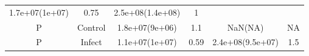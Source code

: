 \documentclass[]{article}
\begin{document}
\begin{longtable}[]{@{}cccccc@{}}
\begin{minipage}[t]{0.15\columnwidth}
1.7e+07(1e+07)
\strut\end{minipage} &
\begin{minipage}[t]{0.16\columnwidth}\centering\strut
0.75
\strut\end{minipage} &
\begin{minipage}[t]{0.16\columnwidth}\centering\strut
2.5e+08(1.4e+08)
\strut\end{minipage} &
\begin{minipage}[t]{0.11\columnwidth}\centering\strut
1
\strut\end{minipage}\tabularnewline
\begin{minipage}[t]{0.12\columnwidth}\centering\strut
P
\strut\end{minipage} &
\begin{minipage}[t]{0.11\columnwidth}\centering\strut
Control
\strut\end{minipage} &
\begin{minipage}[t]{0.15\columnwidth}\centering\strut
1.8e+07(9e+06)
\strut\end{minipage} &
\begin{minipage}[t]{0.16\columnwidth}\centering\strut
1.1
\strut\end{minipage} &
\begin{minipage}[t]{0.16\columnwidth}\centering\strut
NaN(NA)
\strut\end{minipage} &
\begin{minipage}[t]{0.11\columnwidth}\centering\strut
NA
\strut\end{minipage}\tabularnewline
\begin{minipage}[t]{0.12\columnwidth}\centering\strut
P
\strut\end{minipage} &
\begin{minipage}[t]{0.11\columnwidth}\centering\strut
Infect
\strut\end{minipage} &
\begin{minipage}[t]{0.15\columnwidth}\centering\strut
1.1e+07(1e+07)
\strut\end{minipage} &
\begin{minipage}[t]{0.16\columnwidth}\centering\strut
0.59
\strut\end{minipage} &
\begin{minipage}[t]{0.16\columnwidth}\centering\strut
2.4e+08(9.5e+07)
\strut\end{minipage} &
\begin{minipage}[t]{0.11\columnwidth}\centering\strut
1.5
\strut\end{minipage}\tabularnewline
\bottomrule
\end{longtable}
\end{document}
